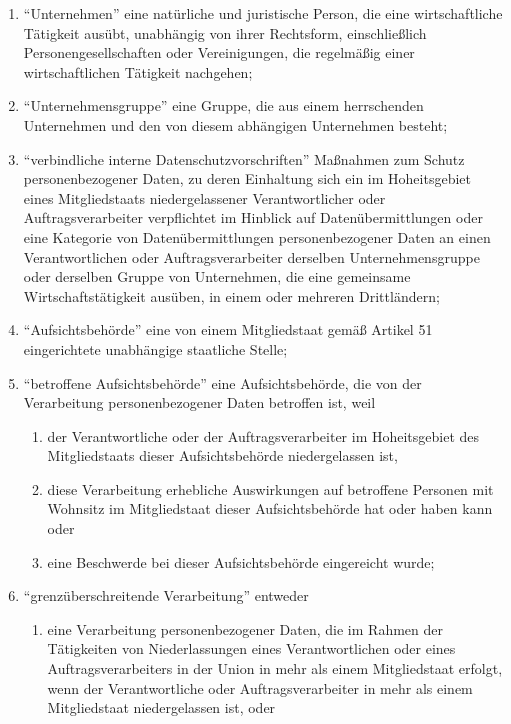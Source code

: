 \begin{enumerate}[label=\arabic*.]
            \item ``Unternehmen'' eine natürliche und juristische Person, die eine wirtschaftliche Tätigkeit ausübt, unabhängig von ihrer Rechtsform, einschließlich Personengesellschaften oder Vereinigungen, die regelmäßig einer wirtschaftlichen Tätigkeit nachgehen;
            \item ``Unternehmensgruppe'' eine Gruppe, die aus einem herrschenden Unternehmen und den von diesem abhängigen Unternehmen besteht; 
            \item ``verbindliche interne Datenschutzvorschriften'' Maßnahmen zum Schutz personenbezogener Daten, zu deren Einhaltung sich ein im Hoheitsgebiet eines Mitgliedstaats niedergelassener Verantwortlicher oder Auftragsverarbeiter verpflichtet im Hinblick auf Datenübermittlungen oder eine Kategorie von Datenübermittlungen personenbezogener Daten an einen Verantwortlichen oder Auftragsverarbeiter derselben Unternehmensgruppe oder derselben Gruppe von Unternehmen, die eine gemeinsame Wirtschaftstätigkeit ausüben, in einem oder mehreren Drittländern;
            \item ``Aufsichtsbehörde'' eine von einem Mitgliedstaat gemäß Artikel 51 eingerichtete unabhängige staatliche Stelle; 
            \item ``betroffene Aufsichtsbehörde'' eine Aufsichtsbehörde, die von der Verarbeitung personenbezogener Daten betroffen ist, weil
                \begin{enumerate}[label=\alph*)]
                    \item der Verantwortliche oder der Auftragsverarbeiter im Hoheitsgebiet des Mitgliedstaats dieser Aufsichtsbehörde niedergelassen ist,
                    \item diese Verarbeitung erhebliche Auswirkungen auf betroffene Personen mit Wohnsitz im Mitgliedstaat dieser Aufsichtsbehörde hat oder haben kann oder
                    \item eine Beschwerde bei dieser Aufsichtsbehörde eingereicht wurde;
                \end{enumerate}
            \item ``grenzüberschreitende Verarbeitung'' entweder
                \begin{enumerate}[label=\alph*)]
                    \item eine Verarbeitung personenbezogener Daten, die im Rahmen der Tätigkeiten von Niederlassungen eines Verantwortlichen oder eines Auftragsverarbeiters in der Union in mehr als einem Mitgliedstaat erfolgt, wenn der Verantwortliche oder Auftragsverarbeiter in mehr als einem Mitgliedstaat niedergelassen ist, oder

\end{enumerate}
\end{enumerate}
